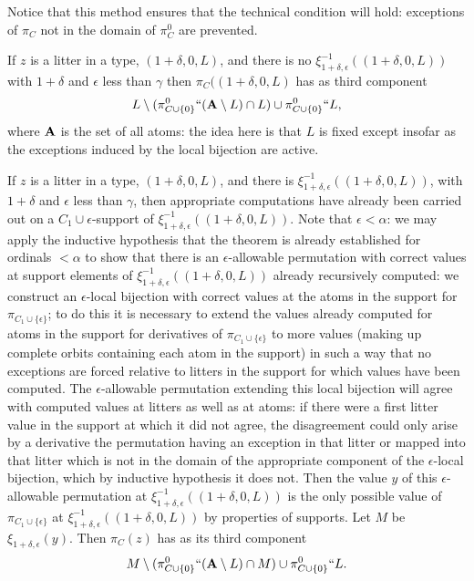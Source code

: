 \documentclass[12pt]{article}
\begin{document}
\begin{description}
Notice that this method ensures that the technical condition will hold:  exceptions of $\pi_C$ not in the domain of $\pi^0_C$ are prevented.

If $z$ is a litter in a type, $(1+\delta,0,L)$, and there is no $\xi^{-1}_{1+\delta,\epsilon}((1+\delta,0,L))$ with $1+\delta$ and $\epsilon$ less than $\gamma$ then $\pi_C((1+\delta,0,L)$ has as third
component $$L \setminus (\pi^0_{C\cup \{0\}}``({\bf A} \setminus L) \cap L) \cup \pi^0_{C\cup \{0\}}``L,$$ where ${\bf A}$ is the set of all atoms:  the idea here is that $L$ is fixed except insofar as the exceptions induced by the local bijection are active.

If $z$ is a litter in a type, $(1+\delta,0,L)$, and there is $\xi^{-1}_{1+\delta,\epsilon}((1+\delta,0,L))$, with $1+\delta$ and $\epsilon$ less than $\gamma$, then appropriate computations have
already been carried out on a $C_1 \cup \epsilon$-support of $\xi^{-1}_{1+\delta,\epsilon}((1+\delta,0,L))$.   Note that $\epsilon <\alpha$:  we may apply the inductive hypothesis that the theorem is already established for ordinals $<\alpha$ to show that there is an $\epsilon$-allowable permutation with correct values at support elements of $\xi^{-1}_{1+\delta,\epsilon}((1+\delta,0,L))$ already recursively computed:  we construct an $\epsilon$-local bijection with correct values at the atoms in the support for $\pi_{C_1 \cup \{\epsilon\}}$;  to do this it is necessary to extend the values already computed for atoms in the support for derivatives of $\pi_{C_1 \cup \{\epsilon\}}$ to more values (making up complete orbits containing each atom in the support) in such a way that no exceptions are forced relative to litters in the support for which values have been computed.  The $\epsilon$-allowable permutation extending this
local bijection will agree with computed values at litters as well as at atoms:  if there were a first litter value in the support at which it did not agree, the disagreement could only arise by a derivative the permutation having an exception in that litter or mapped into that litter which is not in the domain of the appropriate component of the $\epsilon$-local bijection, which by inductive hypothesis it does not.  Then the value $y$ of this
$\epsilon$-allowable permutation at $\xi^{-1}_{1+\delta,\epsilon}((1+\delta,0,L))$ is the only possible value of $\pi_{C_1 \cup \{\epsilon\}}$ at $\xi^{-1}_{1+\delta,\epsilon}((1+\delta,0,L))$ by properties of supports.  Let $M$ be $\xi_{1+\delta,\epsilon}(y)$.  Then $\pi_C(z)$ has as its third component $$M \setminus (\pi^0_{C\cup\{0\}}``({\bf A} \setminus L) \cap M) \cup \pi^0_{C\cup \{0\}}``L.$$


\end{description}
\end{document}
